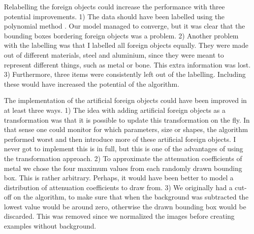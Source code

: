 Relabelling the foreign objects could increase the performance with three potential improvements.
1) The data should have been labelled using the polynomial method . 
Our model managed to converge, but it was clear that the bounding boxes bordering foreign objects was a problem.
2) Another problem with the labelling was that I labelled all foreign objects equally. 
They were made out of different materials, steel and aluminium, since they were meant to represent different things, such as metal or bone.
This extra information was lost.
3) Furthermore, three items were consistently left out of the labelling. 
Including these would have increased the potential of the algorithm.

The implementation of the artificial foreign objects could have been improved in at least three ways.
1) The idea with adding artificial foreign objects as a transformation was that it is possible to update this transformation on the fly. 
In that sense one could monitor for which parameters, size or shapes, the algorithm performed worst and then introduce more of these artificial foreign objects.
I never got to implement this is in full, but this is one of the advantages of using the transformation approach.
2) To approximate the attenuation coefficients of metal we chose the four maximum values from each randomly drawn bounding box. 
This is rather arbitrary.
Perhaps, it would have been better to model a distribution of attenuation coefficients to draw from.
3) We originally had a cut-off on the algorithm, to make sure that when the background was subtracted the lowest value would be around zero, otherwise the drawn bounding box would be discarded. This was removed since we normalized the images before creating examples without background. 
